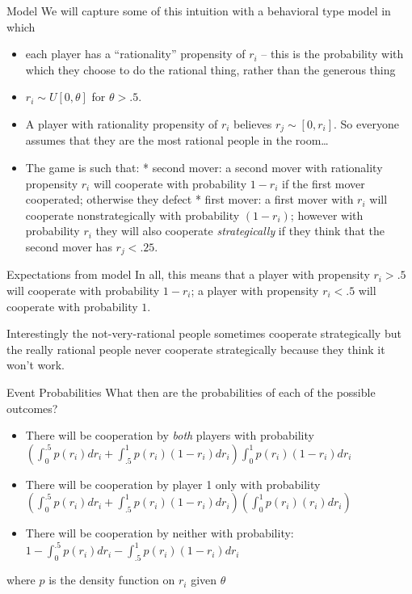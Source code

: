 \documentclass[
  11pt,
  ignorenonframetext,
]{beamer}
\providecommand{\tightlist}{%
  \setlength{\itemsep}{0pt}\setlength{\parskip}{0pt}}\usepackage{longtable,booktabs,array}
\begin{document}
\begin{frame}{Model}
\protect\hypertarget{model}{}
We will capture some of this intuition with a behavioral type model in
which

\begin{itemize}
\tightlist
\item
  each player has a ``rationality'' propensity of \(r_i\) -- this is the
  probability with which they choose to do the rational thing, rather
  than the generous thing
\item
  \(r_i \sim U[0, \theta]\) for \(\theta > .5\).
\item
  A player with rationality propensity of \(r_i\) believes
  \(r_j \sim [0, r_i]\). So everyone assumes that they are the most
  rational people in the room\ldots{}
\item
  The game is such that: * second mover: a second mover with rationality
  propensity \(r_i\) will cooperate with probability \(1-r_i\) if the
  first mover cooperated; otherwise they defect * first mover: a first
  mover with \(r_i\) will cooperate nonstrategically with probability
  \((1-r_i)\); however with probability \(r_i\) they will also cooperate
  \emph{strategically} if they think that the second mover has
  \(r_j<.25\).
\end{itemize}
\end{frame}

\begin{frame}{Expectations from model}
\protect\hypertarget{expectations-from-model}{}
In all, this means that a player with propensity \(r_i>.5\) will
cooperate with probability \(1-r_i\); a player with propensity
\(r_i<.5\) will cooperate with probability \(1\).

Interestingly the not-very-rational people sometimes cooperate
strategically but the really rational people never cooperate
strategically because they think it won't work.
\end{frame}

\begin{frame}{Event Probabilities}
\protect\hypertarget{event-probabilities}{}
What then are the probabilities of each of the possible outcomes?

\begin{itemize}
\tightlist
\item
  There will be cooperation by \emph{both} players with probability
  \((\int_0^{.5} p(r_i) dr_i + \int_{.5}^1 p(r_i)(1-r_i) dr_i)\int_0^1p(r_i)(1-r_i)dr_i\)
\item
  There will be cooperation by player 1 only with probability
  \((\int_0^{.5} p(r_i) dr_i + \int_{.5}^1 p(r_i)(1-r_i) dr_i)(\int_0^1p(r_i)(r_i)dr_i)\)
\item
  There will be cooperation by neither with probability:
  \(1-\int_0^{.5} p(r_i) dr_i - \int_{.5}^1 p(r_i)(1-r_i) dr_i\)
\end{itemize}

where \(p\) is the density function on \(r_i\) given \(\theta\)
\end{frame}
\end{document}
